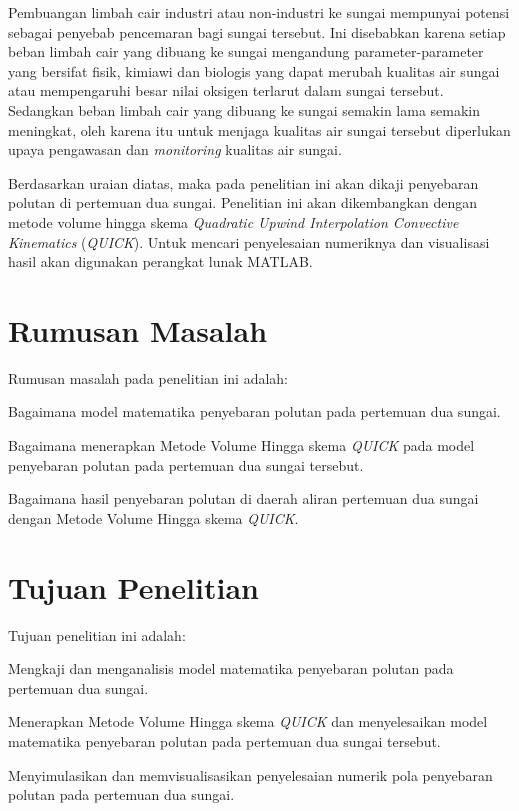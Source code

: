 Pembuangan limbah cair industri atau non-industri ke sungai mempunyai potensi sebagai penyebab pencemaran bagi sungai tersebut. Ini disebabkan karena setiap beban limbah cair yang dibuang ke sungai mengandung parameter-parameter yang bersifat fisik, kimiawi dan biologis yang dapat merubah kualitas air sungai atau mempengaruhi besar nilai oksigen terlarut dalam sungai tersebut. Sedangkan beban limbah cair yang dibuang ke sungai semakin lama semakin meningkat, oleh karena itu untuk menjaga kualitas air sungai tersebut diperlukan upaya pengawasan dan \textit{monitoring} kualitas air sungai.

Berdasarkan uraian diatas, maka pada penelitian ini akan dikaji penyebaran polutan di pertemuan dua sungai. Penelitian ini akan dikembangkan dengan metode volume hingga skema \textit{Quadratic Upwind Interpolation Convective Kinematics} (\textit{QUICK}). Untuk mencari penyelesaian numeriknya dan visualisasi hasil akan digunakan perangkat lunak MATLAB.

\section{Rumusan Masalah}
Rumusan masalah pada penelitian ini adalah:
\begin{tenumerate}
	\item Bagaimana model matematika penyebaran polutan pada pertemuan dua sungai.
	\item Bagaimana menerapkan Metode Volume Hingga skema \textit{QUICK} pada model penyebaran polutan pada pertemuan dua sungai tersebut.
	\item Bagaimana hasil penyebaran polutan di daerah aliran pertemuan dua sungai dengan Metode Volume Hingga skema \textit{QUICK}.
\end{tenumerate}

\section{Tujuan Penelitian}
Tujuan penelitian ini adalah:
\begin{tenumerate}
	\item Mengkaji dan menganalisis model matematika penyebaran polutan pada pertemuan dua sungai.	
	\item Menerapkan Metode Volume Hingga skema \textit{QUICK} dan menyelesaikan model matematika penyebaran polutan pada pertemuan dua sungai tersebut.
	\item Menyimulasikan dan memvisualisasikan penyelesaian numerik pola penyebaran polutan pada pertemuan dua sungai.
\end{tenumerate}

